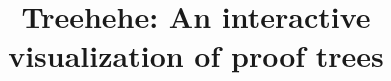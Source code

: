 \documentclass[conference]{IEEEtran}
\newcommand{\projectname}{Treehehe}
\begin{document}
\title{\projectname{}: An interactive visualization of proof trees
}

\author{
}


\maketitle



\newcommand{\sentenceone}{Proofs are commonly illustrated as trees to make the structure of the argument salient.}
\end{document}
